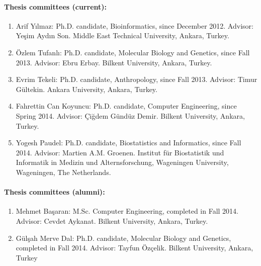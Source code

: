 \paragraph{Thesis committees (current):}

\begin{enumerate}
\item Arif Yılmaz: Ph.D. candidate, Bioinformatics, since December 2012. Advisor: Yeşim Aydın Son. Middle East Technical University, Ankara, Turkey.

\item Özlem Tufanlı: Ph.D. candidate, Molecular Biology and Genetics, since Fall 2013. Advisor: Ebru Erbay. Bilkent University, Ankara, Turkey.

\item Evrim Tekeli: Ph.D. candidate, Anthropology, since Fall 2013. Advisor: Timur Gültekin. Ankara University, Ankara, Turkey.

\item Fahrettin Can Koyuncu: Ph.D. candidate, Computer Engineering, since Spring 2014. Advisor: Çiğdem Gündüz Demir. Bilkent University, Ankara, Turkey.

\item Yogesh Paudel: Ph.D. candidate, Biostatistics and Informatics, since Fall 2014. Advisor: Martien A.M. Groenen. Institut für Biostatistik und Informatik in Medizin und Alternsforschung, Wageningen University, Wageningen, The Netherlands.
\end{enumerate}

\paragraph{Thesis committees (alumni):}
\begin{enumerate}
\item Mehmet Başaran: M.Sc. Computer Engineering, completed in Fall 2014. Advisor: Cevdet Aykanat. Bilkent University, Ankara, Turkey.

\item Gülşah Merve Dal: Ph.D. candidate, Molecular Biology and Genetics, completed in Fall 2014. Advisor: Tayfun Özçelik. Bilkent University, Ankara, Turkey
\end{enumerate}
